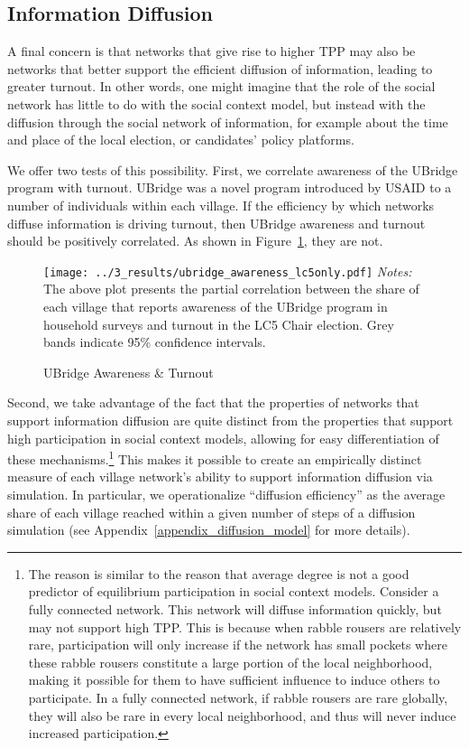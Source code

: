 \documentclass[12pt]{article}
\begin{document}

\subsection{Information Diffusion}

A final concern is that networks that give rise to higher TPP may also be networks that better support the efficient diffusion of information, leading to greater turnout. In other words, one might imagine that the role of the social network has little to do with the social context model, but instead with the diffusion through the social network of information, for example about the time and place of the local election, or candidates' policy platforms.

We offer two tests of this possibility. First, we correlate awareness of the UBridge program with turnout. UBridge was a novel program introduced by USAID to a number of individuals within each village. If the efficiency by which networks diffuse information is driving turnout, then UBridge awareness and turnout should be positively correlated. As shown in Figure~\ref{figure_ubridge_turnout}, they are not.
\begin{figure}[!h]
    \caption{UBridge Awareness \& Turnout}\label{figure_ubridge_turnout}
    \texttt{[image: ../3\_results/ubridge\_awareness\_lc5only.pdf]}
	\scriptsize{\emph{Notes:}  The above plot presents the partial correlation between the share of each village that reports awareness of the UBridge program in household surveys and turnout in the LC5 Chair election.  Grey bands indicate 95\% confidence intervals. }
\end{figure}

Second, we take advantage of the fact that the properties of networks that support information diffusion are quite distinct from the properties that support high participation in social context models, allowing for easy differentiation of these mechanisms.\footnote{The reason is similar to the reason that average degree is not a good predictor of equilibrium participation in social context models. Consider a fully connected network. This network will diffuse information quickly, but may not support high TPP. This is because when rabble rousers are relatively rare, participation will only increase if the network has small pockets where these rabble rousers constitute a large portion of the local neighborhood, making it possible for them to have sufficient influence to induce others to participate. In a fully connected network, if rabble rousers are rare globally, they will also be rare in every local neighborhood, and thus will never induce increased participation.} This makes it possible to create an empirically distinct measure of each village network's ability to support information diffusion via simulation. In particular, we operationalize ``diffusion efficiency'' as the average share of each village reached within a given number of steps of a diffusion simulation (see Appendix~\ref{appendix_diffusion_model} for more details).
\end{document}
